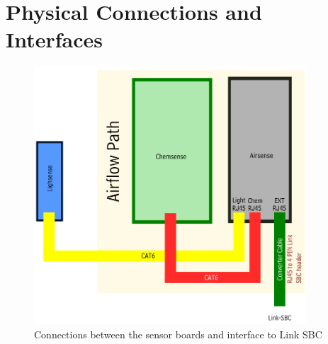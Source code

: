 \section{Physical Connections and Interfaces}

\begin{figure}[h]
\begin{center}
\includegraphics[width=4in]{link.pdf}
\caption{Connections between the sensor boards and interface to Link SBC}
\label{fig:physicalConnections}
\end{center}
\end{figure}

